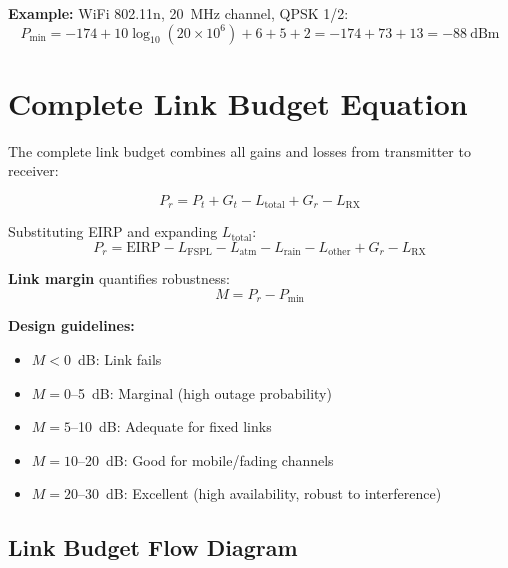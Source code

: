 \textbf{Example:} WiFi 802.11n, 20~MHz channel, QPSK 1/2:
\begin{equation}
P_{\text{min}} = -174 + 10\log_{10}(20 \times 10^6) + 6 + 5 + 2 = -174 + 73 + 13 = -88~\text{dBm}
\end{equation}

\section{Complete Link Budget Equation}

The complete link budget combines all gains and losses from transmitter to receiver:

\begin{equation}
\label{eq:link_budget_complete}
P_r = P_t + G_t - L_{\text{total}} + G_r - L_{\text{RX}}
\end{equation}

Substituting EIRP and expanding $L_{\text{total}}$:
\begin{equation}
\label{eq:link_budget_expanded}
P_r = \text{EIRP} - L_{\text{FSPL}} - L_{\text{atm}} - L_{\text{rain}} - L_{\text{other}} + G_r - L_{\text{RX}}
\end{equation}

\textbf{Link margin} quantifies robustness:
\begin{equation}
\label{eq:margin}
M = P_r - P_{\text{min}}
\end{equation}

\textbf{Design guidelines:}
\begin{itemize}
\item $M < 0$~dB: Link fails
\item $M = 0$--5~dB: Marginal (high outage probability)
\item $M = 5$--10~dB: Adequate for fixed links
\item $M = 10$--20~dB: Good for mobile/fading channels
\item $M = 20$--30~dB: Excellent (high availability, robust to interference)
\end{itemize}

\subsection{Link Budget Flow Diagram}

